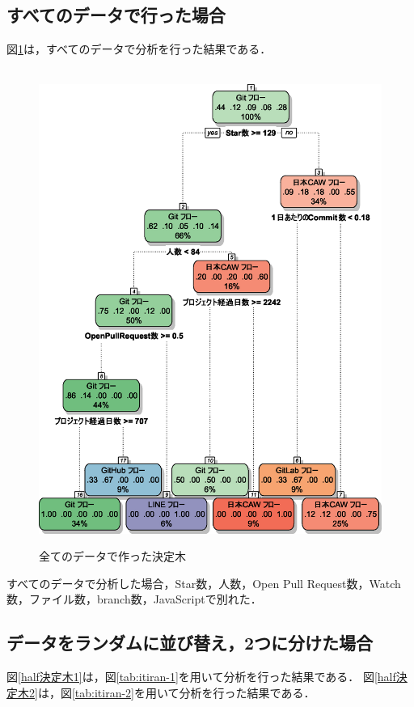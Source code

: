 \subsection{すべてのデータで行った場合}
図\ref{決定木}は，すべてのデータで分析を行った結果である．
\begin{figure}[H]
\centering　
\includegraphics[width=13cm]{allDecisionTree.eps}
\caption{全てのデータで作った決定木}\label{決定木}
\end{figure}

すべてのデータで分析した場合，Star数，人数，Open Pull Request数，Watch数，ファイル数，branch数，JavaScriptで別れた．


\subsection{データをランダムに並び替え，2つに分けた場合}



図\ref{half決定木1}は，図\ref{tab:itiran-1}を用いて分析を行った結果である．
図\ref{half決定木2}は，図\ref{tab:itiran-2}を用いて分析を行った結果である．




